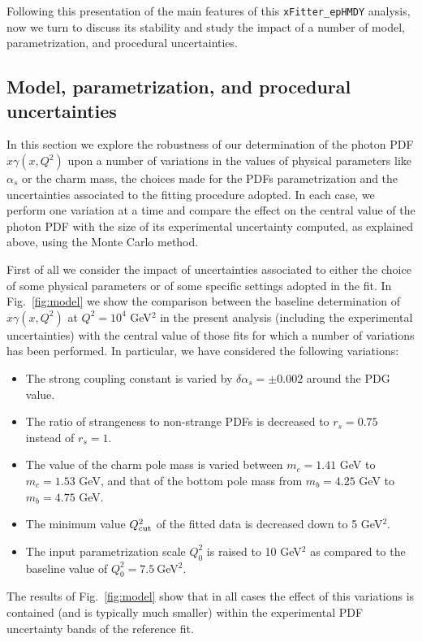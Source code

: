 Following this presentation of the main features of this
{\tt xFitter\_epHMDY} analysis, now we turn to discuss its stability
and study the impact of a number of model, parametrization,
and procedural uncertainties.

\subsection{Model, parametrization, and procedural uncertainties}

In this section we explore the robustness of our determination of
the photon PDF $x\gamma(x,Q^2)$ upon a number of variations
in the values of physical parameters like $\alpha_s$ or the charm mass,
the choices made for the PDFs parametrization and the uncertainties
associated to the fitting procedure adopted.
%
In each case, we perform one variation at a time and compare the effect on
the central value of the photon PDF with the size of its experimental uncertainty
computed, as explained above, using the Monte Carlo method.

First of all we consider the impact  of uncertainties associated to either the choice
of some physical parameters or of some specific settings adopted in the fit.
%
In Fig.~\ref{fig:model} we show the comparison between the baseline determination of
  $x\gamma(x,Q^2)$ at $Q^2=10^4$ GeV$^2$ in the present
analysis (including the experimental uncertainties)
with the central value of those  fits for which a number of variations has been performed.
%
In particular, we have considered the following variations:
\begin{itemize}
\item The strong coupling constant is varied by $\delta \alpha_s=\pm 0.002$ around the PDG value.
\item The ratio of strangeness to non-strange PDFs is decreased to $r_s=0.75$ instead of $r_s=1$.
\item The value of the charm pole mass is varied between $m_c=1.41$ GeV to $m_c=1.53$ GeV,
  and that of the bottom pole mass from $m_b=4.25$ GeV to $m_b=4.75$ GeV.
\item The minimum value $Q^2_{\rm cut}$ of the fitted data is decreased down to 5 GeV$^2$.
\item The input parametrization scale $Q_0^2$ is raised to 10 GeV$^2$ as compared
  to the baseline value of $Q_0^2=7.5~$GeV$^2$.
\end{itemize}
The results of Fig.~\ref{fig:model} show that in all cases the effect of this variations
is contained (and is typically much smaller) within the experimental PDF
uncertainty bands of the reference fit.



